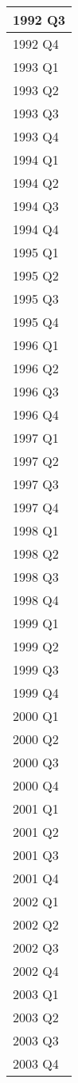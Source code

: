 \documentclass[
]{article}
\begin{document}
\begin{tabular}{l}
\hline
1992 Q3\\
\hline
1992 Q4\\
\hline
1993 Q1\\
\hline
1993 Q2\\
\hline
1993 Q3\\
\hline
1993 Q4\\
\hline
1994 Q1\\
\hline
1994 Q2\\
\hline
1994 Q3\\
\hline
1994 Q4\\
\hline
1995 Q1\\
\hline
1995 Q2\\
\hline
1995 Q3\\
\hline
1995 Q4\\
\hline
1996 Q1\\
\hline
1996 Q2\\
\hline
1996 Q3\\
\hline
1996 Q4\\
\hline
1997 Q1\\
\hline
1997 Q2\\
\hline
1997 Q3\\
\hline
1997 Q4\\
\hline
1998 Q1\\
\hline
1998 Q2\\
\hline
1998 Q3\\
\hline
1998 Q4\\
\hline
1999 Q1\\
\hline
1999 Q2\\
\hline
1999 Q3\\
\hline
1999 Q4\\
\hline
2000 Q1\\
\hline
2000 Q2\\
\hline
2000 Q3\\
\hline
2000 Q4\\
\hline
2001 Q1\\
\hline
2001 Q2\\
\hline
2001 Q3\\
\hline
2001 Q4\\
\hline
2002 Q1\\
\hline
2002 Q2\\
\hline
2002 Q3\\
\hline
2002 Q4\\
\hline
2003 Q1\\
\hline
2003 Q2\\
\hline
2003 Q3\\
\hline
2003 Q4\\

\end{tabular}
\end{document}
